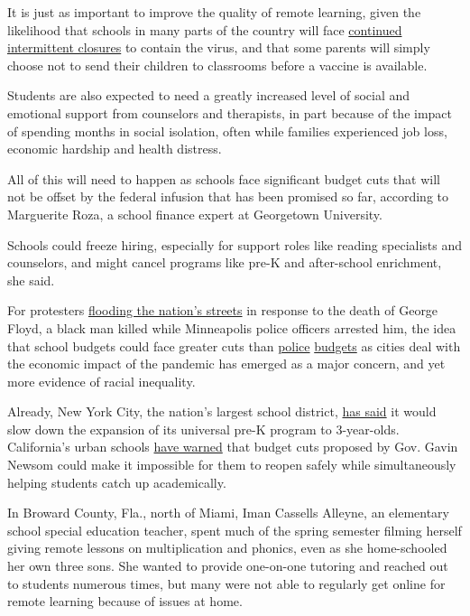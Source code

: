 It is just as important to improve the quality of remote learning, given
the likelihood that schools in many parts of the country will face
\href{https://www.nytimes3xbfgragh.onion/2020/04/28/us/coronavirus-schools-reopen.html}{continued
intermittent closures} to contain the virus, and that some parents will
simply choose not to send their children to classrooms before a vaccine
is available.

Students are also expected to need a greatly increased level of social
and emotional support from counselors and therapists, in part because of
the impact of spending months in social isolation, often while families
experienced job loss, economic hardship and health distress.

All of this will need to happen as schools face significant budget cuts
that will not be offset by the federal infusion that has been promised
so far, according to Marguerite Roza, a school finance expert at
Georgetown University.

Schools could freeze hiring, especially for support roles like reading
specialists and counselors, and might cancel programs like pre-K and
after-school enrichment, she said.

For protesters
\href{https://www.nytimes3xbfgragh.onion/2020/06/03/us/live-george-floyd-protests-today.html}{flooding
the nation's streets} in response to the death of George Floyd, a black
man killed while Minneapolis police officers arrested him, the idea that
school budgets could face greater cuts than
\href{https://www.inquirer.com/news/philadelphia/philadelphia-police-funding-increase-george-floyd-protests-20200602.html}{police}
\href{https://gothamist.com/news/nypd-defends-its-massive-budget-social-services-and-youth-programs-are-cut}{budgets}
as cities deal with the economic impact of the pandemic has emerged as a
major concern, and yet more evidence of racial inequality.

Already, New York City, the nation's largest school district,
\href{https://www.amny.com/education-2/carranza-warns-of-massive-nyc-public-school-cuts-in-face-of-horrific-budget/}{has
said} it would slow down the expansion of its universal pre-K program to
3-year-olds. California's urban schools
\href{https://www.documentcloud.org/documents/6894024-2020-21StateBud-Urban-Let051820.html}{have
warned} that budget cuts proposed by Gov. Gavin Newsom could make it
impossible for them to reopen safely while simultaneously helping
students catch up academically.

In Broward County, Fla., north of Miami, Iman Cassells Alleyne, an
elementary school special education teacher, spent much of the spring
semester filming herself giving remote lessons on multiplication and
phonics, even as she home-schooled her own three sons. She wanted to
provide one-on-one tutoring and reached out to students numerous times,
but many were not able to regularly get online for remote learning
because of issues at home.


